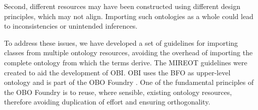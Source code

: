 \documentclass[a4paper,10pt,twocolumn]{article}
\begin{document}


Second, different resources may have been constructed using different design principles, which may not align.
Importing such ontologies as a whole could lead to inconsistencies or unintended inferences.




To address these issues, we have developed a set of guidelines for importing classes from multiple ontology resources, avoiding the overhead of importing the complete ontology from which the terms derive. 
The \ac{MIREOT} guidelines were created to aid the development of \ac{OBI}\cite{RefWorks:1507}.
\ac{OBI} uses the \ac{BFO} \cite{RefWorks:1557} as upper-level ontology and is part of the \ac{OBO} Foundry \cite{RefWorks:1472}. 
One of the fundamental principles of the \ac{OBO} Foundry is to reuse, where sensible, existing ontology resources, therefore avoiding duplication of effort and ensuring orthogonality.

\end{document}
